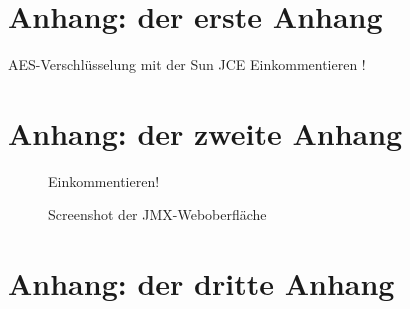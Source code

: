 \documentclass[12pt,oneside,a4paper,bibtotoc,liststotoc,pointlessnumbers]{scrartcl}
\begin{document}
\newpage

\begin{appendix}



\section{Anhang: der erste Anhang}
AES-Verschlüsselung mit der Sun JCE
Einkommentieren !
%
%
%


\newpage


\section{Anhang: der zweite Anhang}
\begin{figure}[h]					
\centering
Einkommentieren!
\caption{Screenshot der JMX-Weboberfläche}		%
\label{fig:Fabrikmethode}							%
\end{figure} 	\vspace{-12pt}

\newpage



\newpage
\section{Anhang: der dritte Anhang}


\end{appendix}
\end{document}
